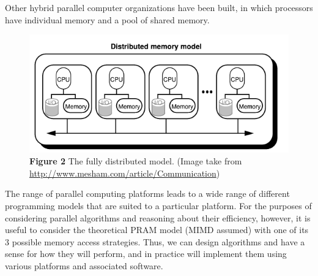\documentclass[letterpaper,10pt,openany,oneside]{sphinxmanual}
\begin{document}
Other hybrid parallel computer organizations have been built, in which processors have individual memory and a pool of shared memory.
\begin{figure}[htbp]
\centering
\capstart

\includegraphics{Figure2.png}
\caption{\textbf{Figure 2} The fully distributed model. (Image take from \href{http://www.mesham.com/article/Communication}{http://www.mesham.com/article/Communication})}\end{figure}

The range of parallel computing platforms leads to a wide range of different programming models that are suited to a particular platform.  For the purposes of considering parallel algorithms and reasoning about their efficiency, however, it is useful to consider the theoretical PRAM model (MIMD assumed) with one of its 3 possible memory access strategies.  Thus, we can design algorithms and have a sense for how they will perform, and in practice will implement them using various platforms and associated software.
\end{document}
